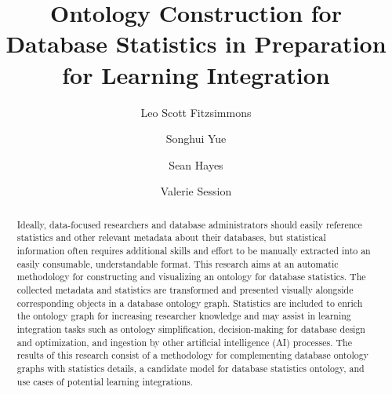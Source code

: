 \documentclass[sigconf]{acmart}
\begin{document}
\title{Ontology Construction for Database Statistics in Preparation for Learning Integration}

\author{Leo Scott Fitzsimmons}

\author{Songhui Yue}

\author{Sean Hayes}
	
\author{Valerie Session}


\renewcommand{\shortauthors}{Trovato et al.}

\begin{abstract}
Ideally, data-focused researchers and database administrators should easily reference statistics and other relevant metadata about their databases, but statistical information often requires additional skills and effort to be manually extracted into an easily consumable, understandable format. This research aims at an automatic methodology for constructing and visualizing an ontology for database statistics. The collected metadata and statistics are transformed and presented visually alongside corresponding objects in a database ontology graph. Statistics are included to enrich the ontology graph for increasing researcher knowledge and may assist in learning integration tasks such as ontology simplification, decision-making for database design and optimization, and ingestion by other artificial intelligence (AI) processes. The results of this research consist of a methodology for complementing database ontology graphs with statistics details, a candidate model for database statistics ontology, and use cases of potential learning integrations.
\end{abstract}
\end{document}
